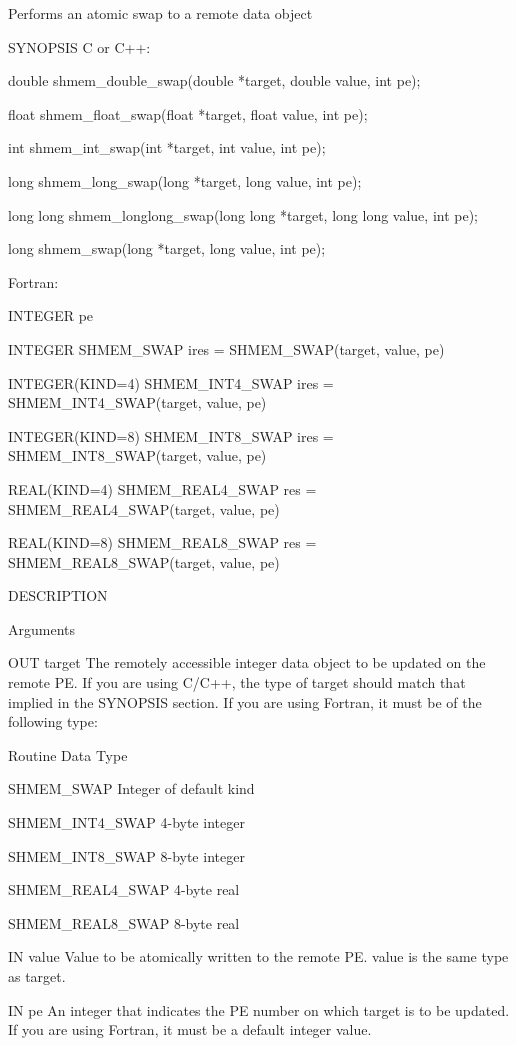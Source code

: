        Performs an atomic swap to a
       remote data object

SYNOPSIS
       C or C++:

	  double shmem_double_swap(double *target, double value, int pe);

	  float shmem_float_swap(float *target, float value, int pe);

	  int shmem_int_swap(int *target, int value, int pe);

	  long shmem_long_swap(long *target, long value, int pe);

	  long long shmem_longlong_swap(long long *target,  long  long	value,
	  int pe);

	  long shmem_swap(long *target, long value, int pe);

       Fortran:

	  INTEGER pe

	  INTEGER SHMEM_SWAP
	  ires = SHMEM_SWAP(target, value, pe)

	  INTEGER(KIND=4) SHMEM_INT4_SWAP
	  ires = SHMEM_INT4_SWAP(target, value, pe)

	  INTEGER(KIND=8) SHMEM_INT8_SWAP
	  ires = SHMEM_INT8_SWAP(target, value, pe)

	  REAL(KIND=4) SHMEM_REAL4_SWAP
	  res = SHMEM_REAL4_SWAP(target, value, pe)

	  REAL(KIND=8) SHMEM_REAL8_SWAP
	  res = SHMEM_REAL8_SWAP(target, value, pe)

DESCRIPTION

Arguments

	OUT       target	 The  remotely accessible integer data object to be updated on
		 the remote PE.	 If you are using C/C++, the  type  of	target
		 should	 match	that  implied in the SYNOPSIS section.	If you
		 are using Fortran, it must be of the following type:

		      Routine		       Data Type

		      SHMEM_SWAP	       Integer of default kind

		      SHMEM_INT4_SWAP	       4-byte integer

		      SHMEM_INT8_SWAP	       8-byte integer

		      SHMEM_REAL4_SWAP	       4-byte real

		      SHMEM_REAL8_SWAP	       8-byte real

       IN	value	 Value to be atomically written to the remote  PE.   value  is
		 the same type as target.

       IN	pe	 An integer that indicates the PE number on which target is to
		 be updated.  If you are using Fortran, it must be  a  default
		 integer value.

